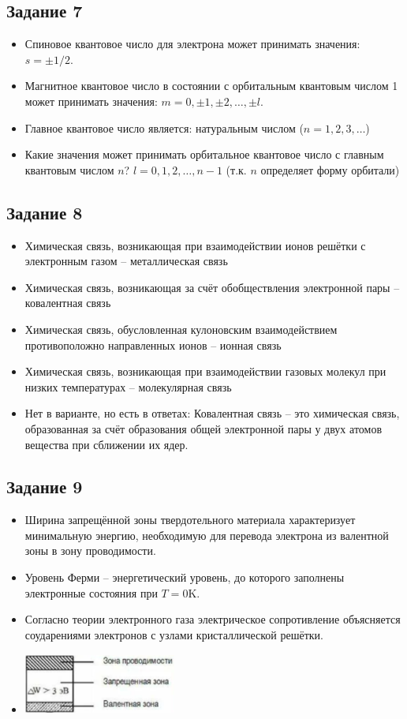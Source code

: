 \documentclass[../main.tex]{subfiles}
\begin{document}
\subsection{Задание 7}
\begin{itemize}
    \item Спиновое квантовое число для электрона может принимать значения: $s = \pm 1/2$.
    \item Магнитное квантовое число в состоянии с орбитальным квантовым числом 1 может принимать значения: $m = 0, \pm1, \pm2, \dots, \pm l$.
    \item Главное квантовое число является: натуральным числом ($n = 1, 2, 3, \dots$)
    \item Какие значения может принимать орбитальное квантовое число с главным квантовым числом $n$? $l = 0, 1, 2, \dots, n-1$ (т.к. $n$ определяет форму орбитали)
\end{itemize}

\subsection{Задание 8}
\begin{itemize}
    \item Химическая связь, возникающая при взаимодействии ионов решётки с электронным газом – металлическая связь
    \item Химическая связь, возникающая за счёт обобществления электронной пары – ковалентная связь
    \item Химическая связь, обусловленная кулоновским взаимодействием противоположно направленных ионов – ионная связь
    \item Химическая связь, возникающая при взаимодействии газовых молекул при низких температурах – молекулярная связь
    \item Нет в варианте, но есть в ответах: Ковалентная связь – это химическая связь, образованная за счёт образования общей электронной пары у двух атомов вещества при сближении их ядер.
\end{itemize}

\subsection{Задание 9}
\begin{itemize}
    \item Ширина запрещённой зоны твердотельного материала характеризует минимальную энергию, необходимую для перевода электрона из валентной зоны в зону проводимости.
    \item Уровень Ферми -- энергетический уровень, до которого заполнены электронные состояния при $T = 0$K.
    \item Согласно теории электронного газа электрическое сопротивление объясняется соударениями электронов с узлами кристаллической решётки.
    \item \includegraphics[width=5cm, height=2cm]{../img/test1_9.png}
\end{itemize}
\end{document}
